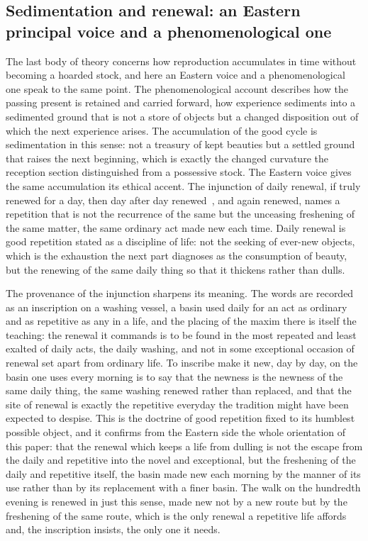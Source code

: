 \subsection{Sedimentation and renewal: an Eastern principal voice and a phenomenological one}
\label{p22:sub:reproduction-sedimentation}

The last body of theory concerns how reproduction accumulates in time without becoming a hoarded stock, and here an Eastern voice and a phenomenological one speak to the same point. The phenomenological account describes how the passing present is retained and carried forward, how experience sediments into a sedimented ground that is not a store of objects but a changed disposition out of which the next experience arises. The accumulation of the good cycle is sedimentation in this sense: not a treasury of kept beauties but a settled ground that raises the next beginning, which is exactly the changed curvature the reception section distinguished from a possessive stock. The Eastern voice gives the same accumulation its ethical accent. The injunction of daily renewal, if truly renewed for a day, then day after day renewed~\parencite{daxue}, and again renewed, names a repetition that is not the recurrence of the same but the unceasing freshening of the same matter, the same ordinary act made new each time. Daily renewal is good repetition stated as a discipline of life: not the seeking of ever-new objects, which is the exhaustion the next part diagnoses as the consumption of beauty, but the renewing of the same daily thing so that it thickens rather than dulls.

The provenance of the injunction sharpens its meaning. The words are recorded as an inscription on a washing vessel, a basin used daily for an act as ordinary and as repetitive as any in a life, and the placing of the maxim there is itself the teaching: the renewal it commands is to be found in the most repeated and least exalted of daily acts, the daily washing, and not in some exceptional occasion of renewal set apart from ordinary life. To inscribe make it new, day by day, on the basin one uses every morning is to say that the newness is the newness of the same daily thing, the same washing renewed rather than replaced, and that the site of renewal is exactly the repetitive everyday the tradition might have been expected to despise. This is the doctrine of good repetition fixed to its humblest possible object, and it confirms from the Eastern side the whole orientation of this paper: that the renewal which keeps a life from dulling is not the escape from the daily and repetitive into the novel and exceptional, but the freshening of the daily and repetitive itself, the basin made new each morning by the manner of its use rather than by its replacement with a finer basin. The walk on the hundredth evening is renewed in just this sense, made new not by a new route but by the freshening of the same route, which is the only renewal a repetitive life affords and, the inscription insists, the only one it needs.

